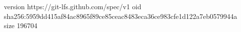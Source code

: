 version https://git-lfs.github.com/spec/v1
oid sha256:5959dd415af84ac8965f89ce85ceac8483eca36ce983cfe1d122a7eb0579944a
size 196704

